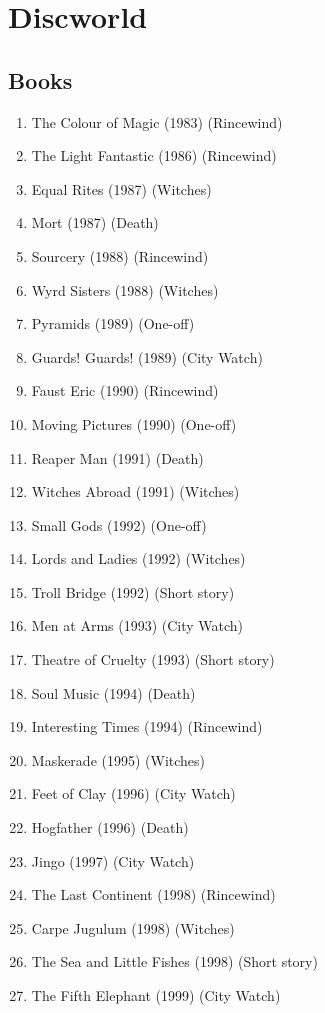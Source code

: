 \section{Discworld}
\subsection{Books}
\begin{enumerate}[topsep=0pt, partopsep=0pt,itemsep=2pt,parsep=2pt]
\item{The Colour of Magic (1983) (Rincewind)}
\item{The Light Fantastic (1986) (Rincewind) }
\item{Equal Rites (1987) (Witches) }
\item{Mort (1987) (Death) }
\item{Sourcery (1988) (Rincewind) }
\item{Wyrd Sisters (1988) (Witches) }
\item{Pyramids (1989) (One-off) }
\item{Guards! Guards! (1989) (City Watch) }
\item{Faust Eric (1990) (Rincewind) }
\item{Moving Pictures (1990) (One-off) }
\item{Reaper Man (1991) (Death) }
\item{Witches Abroad (1991) (Witches) }
\item{Small Gods (1992) (One-off) }
\item{Lords and Ladies (1992) (Witches) }
\item{Troll Bridge (1992) (Short story) }
\item{Men at Arms (1993) (City Watch) }
\item{Theatre of Cruelty (1993) (Short story) }
\item{Soul Music (1994) (Death) }
\item{Interesting Times (1994) (Rincewind) }
\item{Maskerade (1995) (Witches) }
\item{Feet of Clay (1996) (City Watch) }
\item{Hogfather (1996) (Death) }
\item{Jingo (1997) (City Watch) }
\item{The Last Continent (1998) (Rincewind) }
\item{Carpe Jugulum (1998) (Witches) }
\item{The Sea and Little Fishes (1998) (Short story) }
\item{The Fifth Elephant (1999) (City Watch) }

\end{enumerate}
